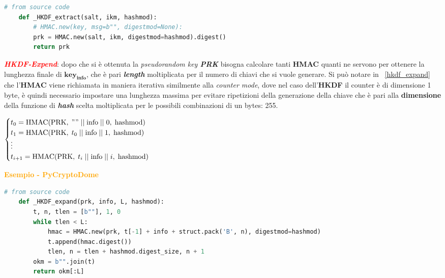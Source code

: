 \begin{lstlisting}[language=python, label={hkdf_extract}, caption={\_HKDF\_extract da PyCryptoDome}]
    # from source code
    def _HKDF_extract(salt, ikm, hashmod):
        # HMAC.new(key, msg=b"", digestmod=None):
        prk = HMAC.new(salt, ikm, digestmod=hashmod).digest()
        return prk
\end{lstlisting}

\begin{flushleft}
    \textcolor{red}{\textbf{\textit{HKDF-Expend}}}: dopo che si è ottenuta la \textit{pseudorandom key \textbf{PRK}} bisogna calcolare tanti \textbf{HMAC} quanti ne servono per ottenere la lunghezza finale di $\mathbf{key_{info}}$, che è pari \textbf{\textit{length}} moltiplicata per il numero di chiavi che si vuole generare. Si può notare in ~\ref{hkdf_expand} che l'\textbf{HMAC} viene richiamata in maniera iterativa similmente alla \textit{counter mode}, dove nel caso dell'\textbf{HKDF} il counter è di dimensione 1 byte, è quindi necessario impostare una lunghezza massima per evitare ripetizioni della generazione della chiave che è pari alla \textbf{dimensione} della funzione di \textbf{\textit{hash}} scelta moltiplicata per le possibili combinazioni di un bytes: 255.

    \begin{center} \begin{math} \begin{cases}
                t_0 = \text{HMAC}(\text{PRK}, \; "" \; || \; \text{info} \; || \; 0, \; \text{hashmod}) \\
                t_1 = \text{HMAC}(\text{PRK}, \; t_0 \; || \; \text{info} \; || \; 1, \; \text{hashmod}) \\
                \vdots \\
                t_{i + 1} = \text{HMAC}(\text{PRK}, \; t_i \; || \; \text{info} \; || \; i, \; \text{hashmod}) \\
    \end{cases} \end{math} \end{center}
    \textcolor{orange}{\textbf{Esempio - PyCryptoDome}}
\end{flushleft}

\begin{lstlisting}[language=python, label={hkdf_expand}, caption={\_HKDF\_expand da PyCryptoDome}]
    # from source code
    def _HKDF_expand(prk, info, L, hashmod):
        t, n, tlen = [b""], 1, 0
        while tlen < L:
            hmac = HMAC.new(prk, t[-1] + info + struct.pack('B', n), digestmod=hashmod)
            t.append(hmac.digest())
            tlen, n = tlen + hashmod.digest_size, n + 1
        okm = b"".join(t)
        return okm[:L]
\end{lstlisting}

